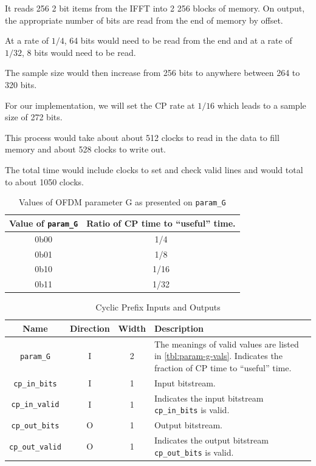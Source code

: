 \documentclass[dvips,10pt,twocolumn]{article}
\newcommand{\wire}{\texttt}
\begin{document}
	It reads 256 2 bit items from the IFFT into 2 256 blocks of memory.
	On output, the appropriate number of bits are read from the end of 
	memory by offset.
	
	At a rate of $1/4$, 64 bits would need to be read from the end and 
	at a rate of $1/32$, 8 bits would need to be read.
	
	The sample size would then increase from 256 bits to anywhere between
	264 to 320 bits.
	
	For our implementation, we will set the CP rate at $1/16$ which leads to
	a sample size of 272 bits.
	
	This process would take about about 512 clocks to read in the data to fill
	memory and about 528 clocks to write out. 

	The total time would include clocks to set and check valid lines and would
	total to about 1050 clocks. 
	
	\begin{table}
	\begin{tabulary}{\linewidth}{C|C}
		\label{tbl:param-g-vals}
		Value of \wire{param\_G} & Ratio of CP time to
		``useful'' time. \\ \hline

		0b00 & 1/4 \\
		0b01 & 1/8 \\
		0b10 & 1/16 \\
		0b11 & 1/32 \\

	\end{tabulary}
	\caption{Values of OFDM parameter G as presented on
	\wire{param\_G}}
	\end{table}

	\begin{table}
	\begin{tabularx}{\linewidth}{c|c|c|X}
		\label{tbl:cp-io}
		Name & Direction & Width & Description \\ \hline

		\wire{param\_G} & I & 2 & The meanings of valid values
		are listed in \autoref{tbl:param-g-vals}. Indicates the
		fraction of CP time to ``useful'' time.
		\\

		\wire{cp\_in\_bits} & I & 1 & Input bitstream. \\
		
		\wire{cp\_in\_valid} & I & 1 & Indicates the input
		bitstream \wire{cp\_in\_bits} is valid. \\

		\wire{cp\_out\_bits} & O & 1 & Output bitstream. \\

		\wire{cp\_out\_valid} & O & 1 & Indicates the output
		bitstream \wire{cp\_out\_bits} is valid.
	\end{tabularx}
	\caption{Cyclic Prefix Inputs and Outputs}
	\end{table}
\end{document}
